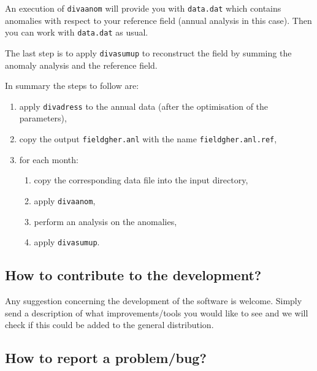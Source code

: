 An execution of \texttt{divaanom} will provide you with \texttt{data.dat} which contains anomalies with respect to your reference field (annual analysis in this case). Then you can work with \texttt{data.dat} as usual. 

The last step is to apply \texttt{divasumup} to reconstruct the field by summing the anomaly analysis and the reference field.

In summary the steps to follow are:

\begin{enumerate} 
\item apply \texttt{divadress} to the annual data (after the optimisation of the parameters),
\item copy the output \texttt{fieldgher.anl} with the name \texttt{fieldgher.anl.ref},
\item for each month:
\begin{enumerate}
\item copy the corresponding data file into the input directory,
\item apply \texttt{divaanom},
\item perform an analysis on the anomalies,
\item apply \texttt{divasumup}.
\end{enumerate}									 
\end{enumerate}
									 
%
%

\subsection{How to contribute to the development?}

Any suggestion concerning the development of the software is welcome. Simply send a description of what improvements/tools you would like to see and we will check if this could be added to the general distribution.


\subsection{How to report a problem/bug?} 

